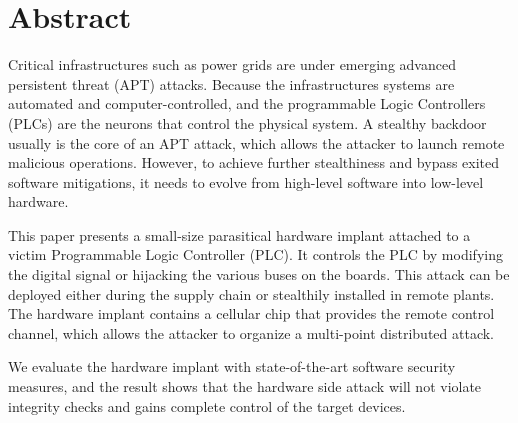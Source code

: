 \section{Abstract}
\label{sec:implant-abstract}

%
%


Critical infrastructures such as power grids are under emerging advanced persistent threat (APT) attacks. Because the infrastructures systems are automated and computer-controlled, and the programmable Logic Controllers (PLCs) are the neurons that control the physical system. A stealthy backdoor usually is the core of an APT attack, which allows the attacker to launch remote malicious operations. However, to achieve further stealthiness and bypass exited software mitigations, it needs to evolve from high-level software into low-level hardware.

This paper presents a small-size parasitical hardware implant attached to a victim Programmable Logic Controller (PLC). It controls the PLC by modifying the digital signal or hijacking the various buses on the boards. This attack can be deployed either during the supply chain or stealthily installed in remote plants. The hardware implant contains a cellular chip that provides the remote control channel, which allows the attacker to organize a multi-point distributed attack.

We evaluate the hardware implant with state-of-the-art software security measures, and the result shows that the hardware side attack will not violate integrity checks and gains complete control of the target devices. 


